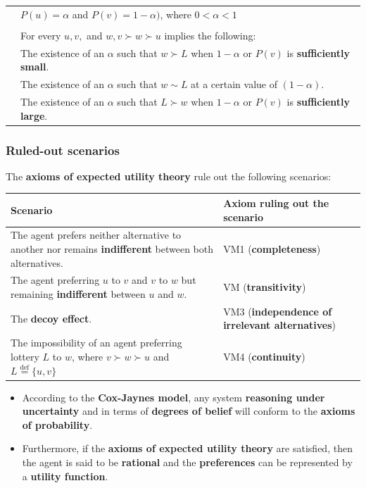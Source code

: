 \documentclass[11pt]{article}
\newcommand{\defequal}{\stackrel{\scriptscriptstyle\mathrm{def}}{=}}
\begin{document}
\begin{center}
\begin{tabular}{|m{7em}|m{25em}|}
 & \(P(u) = \alpha\) and \(P(v) = 1 - \alpha)\), where \(0 < \alpha < 1\)\\
 & \\
 & For every \(u, v,\) and \(w, v \succ w \succ u\) implies the following:\\
 & The existence of an \(\alpha\) such that \(w \succ L\) when \(1 - \alpha\) or \(P(v)\) is \textbf{sufficiently small}.\\
 & The existence of an \(\alpha\) such that \(w \sim L\) at a certain value of \((1 - \alpha)\).\\
 & The existence of an \(\alpha\) such that \(L \succ w\) when \(1 - \alpha\) or \(P(v)\) is \textbf{sufficiently large}.\\
\hline
\end{tabular}
\end{center}
\subsubsection{Ruled-out scenarios}
\label{sec:org01fb52b}
The \textbf{axioms of expected utility theory} rule out the following scenarios:
\begin{center}
\begin{tabularx}{\textwidth}{|X|X|}
\hline
Scenario & Axiom ruling out the scenario\\
\hline
The agent prefers neither alternative to another nor remains \textbf{indifferent} between both alternatives. & VM1 (\textbf{completeness})\\
\hline
The agent preferring \(u\) to \(v\) and \(v\) to \(w\) but remaining \textbf{indifferent} between \(u\) and \(w\). & VM (\textbf{transitivity})\\
\hline
The \textbf{decoy effect}. & VM3 (\textbf{independence of irrelevant alternatives})\\
\hline
The impossibility of an agent preferring lottery \(L\) to \(w\), where \(v \succ w \succ u\) and \(L \defequal \{u, v\}\) & VM4 (\textbf{continuity})\\
\hline
\end{tabularx}
\end{center}

\begin{itemize}
\item According to the \textbf{Cox-Jaynes model}, any system \textbf{reasoning under uncertainty} and in terms of \textbf{degrees of belief} will conform to the \textbf{axioms of probability}.
\item Furthermore, if the \textbf{axioms of expected utility theory} are satisfied, then the agent is said to be \textbf{rational} and the \textbf{preferences} can be represented by a \textbf{utility function}.
\end{itemize}
\end{document}
